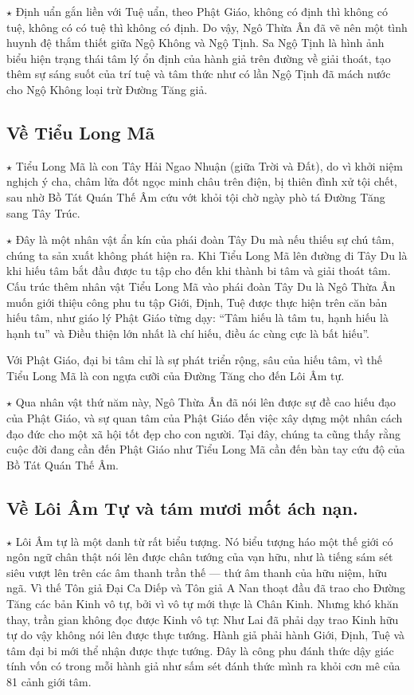 $\star$ Định uẩn gắn liền với Tuệ uẩn, theo Phật Giáo, không có định thì không có tuệ, không có có tuệ thì không có định. Do vậy, Ngô Thừa Ân đã vẽ nên một tình huynh đệ thắm thiết giữa Ngộ Không và Ngộ Tịnh. Sa Ngộ Tịnh là hình ảnh biểu hiện trạng thái tâm lý ổn định của hành giả trên đường về giải thoát, tạo thêm sự sáng suốt của trí tuệ và tâm thức như có lần Ngộ Tịnh đã mách nước cho Ngộ Không loại trừ Đường Tăng giả.


\subsection{Về Tiểu Long Mã} %
\label{sub:ve_tieu_long_ma}

$\star$ Tiểu Long Mã là con Tây Hải Ngao Nhuận (giữa Trời và Đất), do vì khởi niệm nghịch ý cha, châm lửa đốt ngọc minh châu trên điện, bị thiên đình xử tội chết, sau nhờ Bồ Tát Quán Thế Âm cứu vớt khỏi tội chờ ngày phò tá Đường Tăng sang Tây Trúc.

$\star$ Đây là một nhân vật ẩn kín của phái đoàn Tây Du mà nếu thiếu sự chú tâm, chúng ta sản xuất không phát hiện ra. Khi Tiểu Long Mã lên đường đi Tây Du là khi hiếu tâm bắt đầu được tu tập cho đến khi thành bi tâm và giải thoát tâm. Cấu trúc thêm nhân vật Tiểu Long Mã vào phái đoàn Tây Du là Ngô Thừa Ân muốn giới thiệu công phu tu tập Giới, Định, Tuệ được thực hiện trên căn bản hiếu tâm, như giáo lý Phật Giáo từng dạy: ``Tâm hiếu là tâm tu, hạnh hiếu là hạnh tu'' và Điều thiện lớn nhất là chí hiếu, điều ác cùng cực là bất hiếu''.

Với Phật Giáo, đại bi tâm chỉ là sự phát triển rộng, sâu của hiếu tâm, vì thế Tiểu Long Mã là con ngựa cưỡi của Đường Tăng cho đến Lôi Âm tự.

$\star$ Qua nhân vật thứ năm này, Ngô Thừa Ân đã nói lên được sự đề cao hiếu đạo của Phật Giáo, và sự quan tâm của Phật Giáo đến việc xây dựng một nhân cách đạo đức cho một xã hội tốt đẹp cho con người. Tại đây, chúng ta cũng thấy rằng cuộc đời đang cần đến Phật Giáo như Tiểu Long Mã cần đến bàn tay cứu độ của Bồ Tát Quán Thế Âm.

\subsection{Về Lôi Âm Tự và tám mươi mốt ách nạn.} %
\label{sub:ve_loi_am_tu_va_tam_muoi_mot_ach_nan}

$\star$ Lôi Âm tự là một danh từ rất biểu tượng. Nó biểu tượng háo một thế giới có ngôn ngữ chân thật nói lên được chân tướng của vạn hữu, như là tiếng sám sét siêu vượt lên trên các âm thanh trần thế — thứ âm thanh của hữu niệm, hữu ngã. Vì thế Tôn giả Đại Ca Diếp và Tôn giả A Nan thoạt đầu đã trao cho Đường Tăng các bản Kinh vô tự, bởi vì vô tự mới thực là Chân Kinh. Nhưng khó khăn thay, trần gian không đọc được Kinh vô tự: Như Lai đã phải dạy trao Kinh hữu tự do vậy không nói lên được thực tướng. Hành giả phải hành Giới, Định, Tuệ và tâm đại bi mới thể nhận được thực tướng. Đây là công phu đánh thức dậy giác tính vốn có trong mỗi hành giả như sấm sét đánh thức mình ra khỏi cơn mê của 81 cảnh giới tâm.

